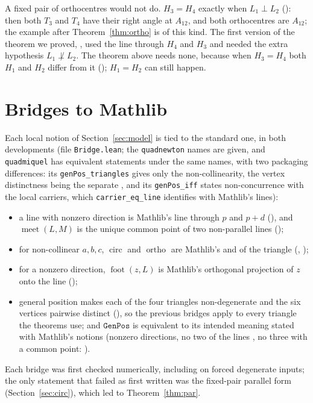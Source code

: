 \documentclass[11pt]{article}
\theoremstyle{definition}
\theoremstyle{remark}
\newcommand{\lean}[1]{\texttt{#1}}
\begin{document}
A fixed pair of orthocentres would not do. $H_3=H_4$ exactly when $L_1\perp L_2$
(): then both $T_3$ and $T_4$ have their right angle at $A_{12}$, and
both orthocentres are $A_{12}$; the example after Theorem~\ref{thm:ortho} is of this kind. The first
version of the theorem we proved, , used the line through
$H_4$ and $H_3$ and needed the extra hypothesis $L_1\not\perp L_2$. The theorem above needs none,
because when $H_3=H_4$ both $H_1$ and $H_2$ differ from it ();
$H_1=H_2$ can still happen.

\section{Bridges to Mathlib}\label{sec:bridges}
Each local notion of Section~\ref{sec:model} is tied to the standard one, in both developments
(file \lean{Bridge.lean}; the \lean{quadnewton} names are given, and \lean{quadmiquel} has
equivalent statements under the same names, with two packaging differences: its
\lean{genPos\_triangles} gives only the non-collinearity, the vertex distinctness being the separate
, and its \lean{genPos\_iff} states non-concurrence with the local
carriers, which \lean{carrier\_eq\_line} identifies with Mathlib's lines):
\begin{itemize}
\item a line with nonzero direction is Mathlib's line through $p$ and $p+d$
(), and $\operatorname{meet}(L,M)$ is the unique common point of two
non-parallel lines ();
\item for non-collinear $a,b,c$, $\operatorname{circ}$ and $\operatorname{ortho}$ are Mathlib's
 and  of the triangle
(, );
\item for a nonzero direction, $\operatorname{foot}(z,L)$ is Mathlib's orthogonal projection of $z$ onto
the line ();
\item general position makes each of the four triangles non-degenerate
and the six vertices pairwise distinct (), so the previous bridges apply to every triangle the theorems
use; and $\lean{GenPos}$ is equivalent to its intended meaning stated with Mathlib's notions (nonzero
directions, no two of the lines , no three with a common point:
).
\end{itemize}
Each bridge was first checked numerically, including on forced degenerate inputs; the only statement
that failed as first written was the fixed-pair parallel form 
(Section~\ref{sec:circ}), which led to Theorem~\ref{thm:par}.
\end{document}

